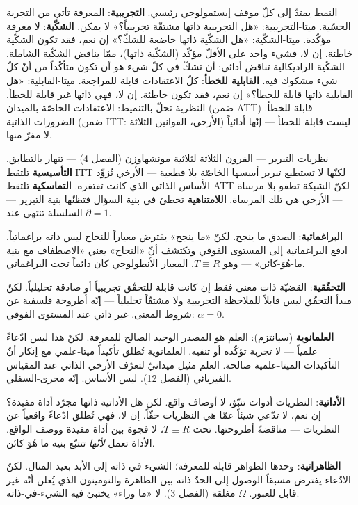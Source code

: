 \documentclass[10pt, openany, oneside]{book}
\begin{document}
النمط يمتدّ إلى كلّ موقف إبستمولوجي رئيسي. \textbf{التجريبية}: المعرفة تأتي من التجربة الحسّية. ميتا-التجريبية: «هل التجريبية ذاتها مشتقّة تجريبياً؟» لا يمكن. \textbf{الشكّية}: لا معرفة مؤكّدة. ميتا-الشكّية: «هل الشكّية ذاتها خاضعة للشكّ؟» إن نعم، فقد تكون الشكّية خاطئة. إن لا، فشيء واحد على الأقلّ مؤكّد (الشكّية ذاتها)، ممّا يناقض الشكّية الشاملة. الشكّية الراديكالية تناقض أدائي: أن تشكّ في كلّ شيء هو أن تكون متأكّداً من أنّ كلّ شيء مشكوك فيه. \textbf{القابلية للخطأ}: كلّ الاعتقادات قابلة للمراجعة. ميتا-القابلية: «هل القابلية ذاتها قابلة للخطأ؟» إن نعم، فقد تكون خاطئة. إن لا، فهي ذاتها غير قابلة للخطأ. النظرية تحلّ بالتنميط: الاعتقادات الخاصّة بالميدان (ضمن ATT) قابلة للخطأ. الضرورات الذاتية (ضمن ITT: الأرخي، القوانين الثلاثة) ليست قابلة للخطأ --- إنّها أدائياً لا مفرّ منها.

نظريات التبرير --- القرون الثلاثة لثلاثية مونشهاوزن (الفصل 4) --- تنهار بالتطابق. \textbf{التأسيسية} تلتقط ITT لكنّها لا تستطيع تبرير أسسها الخاصّة بلا قطعية --- الأرخي تُزوِّد الأساس الذاتي الذي كانت تفتقره. \textbf{التماسكية} تلتقط ATT لكنّ الشبكة تطفو بلا مرساة --- الأرخي هي تلك المرساة. \textbf{اللامتناهية} تخطئ في بنية السؤال فتظنّها بنية التبرير --- السلسلة تنتهي عند $\partial = 1$.

\textbf{البراغماتية}: الصدق ما ينجح. لكنّ «ما ينجح» يفترض معياراً للنجاح ليس ذاته براغماتياً. ادفع البراغماتية إلى المستوى الفوقي وتكتشف أنّ «النجاح» يعني «الاصطفاف مع بنية ما-هُوَ-كائن» --- وهو $T \equiv R$. المعيار الأنطولوجي كان دائماً تحت البراغماتي.

\textbf{التحقّقية}: القضيّة ذات معنى فقط إن كانت قابلة للتحقّق تجريبياً أو صادقة تحليلياً. لكنّ مبدأ التحقّق ليس قابلاً للملاحظة التجريبية ولا مشتقّاً تحليلياً --- إنّه أطروحة فلسفية عن شروط المعنى. غير ذاتي عند المستوى الفوقي: $\alpha = 0$.

\textbf{العلمانوية} (سيانتزم): العلم هو المصدر الوحيد الصالح للمعرفة. لكنّ هذا ليس ادّعاءً علمياً --- لا تجربة تؤكّده أو تنفيه. العلمانوية تُطلق تأكيداً ميتا-علمي مع إنكار أنّ التأكيدات الميتا-علمية صالحة. العلم مثيل ميدانيّ لتعرّف الأرخي الذاتي عند المقياس الفيزيائي (الفصل 12). ليس الأساس. إنّه مجرى-السفلي.

\textbf{الأداتية}: النظريات أدوات تنبّؤ، لا أوصاف واقع. لكن هل الأداتية ذاتها مجرّد أداة مفيدة؟ إن نعم، لا تدّعي شيئاً عمّا هي النظريات حقّاً. إن لا، فهي تُطلق ادّعاءً واقعياً عن النظريات --- مناقضةً أطروحتها. تحت $T \equiv R$، لا فجوة بين أداة مفيدة ووصف الواقع. الأداة تعمل \textit{لأنّها} تتتبّع بنية ما-هُوَ-كائن.

\textbf{الظاهراتية}: وحدها الظواهر قابلة للمعرفة؛ الشيء-في-ذاته إلى الأبد بعيد المنال. لكنّ الادّعاء يفترض مسبقاً الوصول إلى الحدّ ذاته بين الظاهرة والنومينون الذي يُعلن أنّه غير قابل للعبور. $\Omega$ مغلقة (الفصل 3). لا «ما وراء» يختبئ فيه الشيء-في-ذاته.
\end{document}
